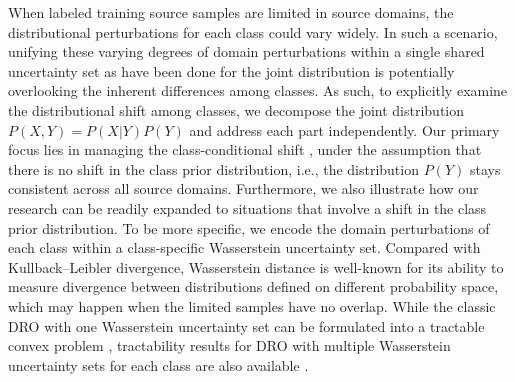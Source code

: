 \documentclass[journal]{IEEEtran}
\begin{document}
When labeled training source samples are limited in source domains, the distributional perturbations for each class could vary widely. In such a scenario,
unifying these varying degrees of domain perturbations within a single shared uncertainty set as have been done for the joint distribution is potentially overlooking the inherent differences among classes.
As such, to explicitly examine the distributional shift among classes, we decompose the joint distribution $P(X, Y)=P(X|Y)P(Y)$ and address each part independently. Our primary focus lies in managing the class-conditional shift \cite{zhang2013domain}, under the assumption that there is no shift in the class prior distribution, i.e., the distribution $P(Y)$ stays consistent across all source domains. Furthermore, we also illustrate how our research can be readily expanded to situations that involve a shift in the class prior distribution.
To be more specific, we encode the domain perturbations of each class within a class-specific Wasserstein uncertainty set.
Compared with Kullback–Leibler divergence, Wasserstein distance is well-known for its ability to measure divergence between distributions defined on different probability space, which may happen when the limited samples have no overlap. 
While the classic DRO with one Wasserstein uncertainty set can be formulated into a tractable convex problem \cite{kuhn2019wasserstein},
tractability results for DRO with multiple Wasserstein uncertainty sets for each class are also available \cite{gao2018robust}.
\end{document}

